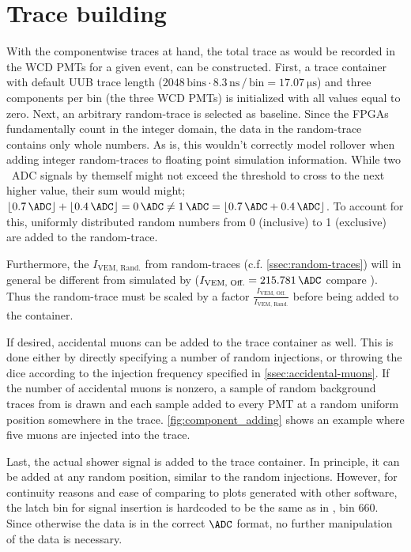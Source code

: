 \section{Trace building}
\label{sec:trace-building}

With the componentwise traces at hand, the total trace as would be recorded in the WCD PMTs for a given event, can be constructed. First, a trace container with 
default UUB trace length ($2048\,\text{bins}\cdot8.3\,\mathrm{ns}\,/\,\text{bin}=\SI{17.07}{\micro\second}$) and three components per bin (the three WCD PMTs) is 
initialized with all values equal to zero. Next, an arbitrary random-trace is selected as baseline. Since the FPGAs fundamentally count in the integer domain, the 
\SI{}{\ADC} data in the random-trace contains only whole numbers. As is, this wouldn't correctly model rollover when adding integer random-traces to floating point
simulation information. While two \SI{}{ADC} signals by themself might not exceed the threshold to cross to the next higher value, their sum would might; 
$\lfloor \SI{0.7}{\ADC} \rfloor + \lfloor \SI{0.4}{\ADC} \rfloor = \SI{0}{\ADC} \neq \SI{1}{\ADC} = \lfloor \SI{0.7}{\ADC} + \SI{0.4}{\ADC} \rfloor$. To account 
for this, uniformly distributed random numbers from 0 (inclusive) to 1 (exclusive) are added to the random-trace. 

Furthermore, the $I_\text{VEM, Rand.}$ from random-traces (c.f. \autoref{ssec:random-traces}) will in general be different from \Ipeak simulated by 
\Offline ($I_\text{VEM, Off.} = \SI{215.781}{\ADC}$ compare \cite{offlineSource}). Thus the random-trace must be scaled by a factor 
$\frac{I_\text{VEM, Off.}}{I_\text{VEM, Rand.}}$ before being added to the container. 

If desired, accidental muons can be added to the trace container as well. This is done either by directly specifying a number of random injections, or throwing the
dice according to the injection frequency specified in \autoref{ssec:accidental-muons}. If the number of accidental muons is nonzero, a sample of random background
traces from \cite{DavidBackgroundSim} is drawn and each sample added to every PMT at a random uniform position somewhere in the trace. 
\autoref{fig:component_adding} shows an example where five muons are injected into the trace.

Last, the actual shower signal is added to the trace container. In principle, it can be added at any random position, similar to the random injections. However, 
for continuity reasons and ease of comparing to plots generated with other software, the latch bin for signal insertion is hardcoded to be the same as in \Offline,
bin $660$. Since otherwise the data is in the correct $\SI{}{\ADC}$ format, no further manipulation of the data is necessary.

